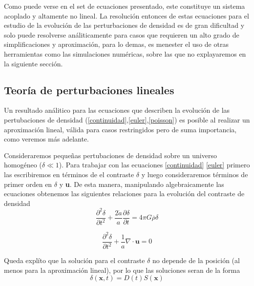Como puede verse en el set de ecuaciones presentado, este constituye un sistema acoplado y altamente no lineal. La resoluci\'on entonces de estas ecuaciones para el estudio de la evoluci\'on de las perturbaciones de densidad es de gran dificultad y solo puede resolverse an\'aliticamente para casos que requieren un alto grado de simplificaciones y aproximaci\'on, para lo demas, es menester el uso de otras herramientas como las simulaciones num\'ericas, sobre las que no explayaremos en la siguiente secci\'on. 



\subsection{Teor\'ia de perturbaciones lineales}
\label{PerturbacionesLineales}

Un resultado an\'alitico para las ecuaciones que describen la evoluci\'on de las pertubaciones de densidad (\ref{continuidad},\ref{euler},\ref{poisson}) es posible al realizar un aproximaci\'on lineal, v\'alida para casos restringidos pero de suma importancia, como veremos m\'as adelante.


Consideraremos peque\~nas pertubaciones de densidad sobre un universo homog\'eneo ($\delta \ll 1 $). Para trabajar con las ecuaciones \ref{continuidad} \ref{euler} primero las escribiremos en t\'erminos de el contraste $\delta$ y luego consideraremos t\'erminos de primer orden en $\delta$ y \textbf{u}. De esta manera, manipulando algebraicamente las ecuaciones obtenemos las siguientes relaciones para la evoluci\'on del contraste de densidad \citep{ElPeebles}
\begin{equation}
 \frac{\partial^{2}\delta}{\partial t ^{2}}+ \frac{2 \dot{a}}{a}\frac{\partial \delta}{\partial t}=4\pi G   \overline{\rho}\delta 
 \label{EcuacionDeltaAproximacion}
\end{equation}

\begin{equation}
    \frac{\partial ^{2}{\delta}}{\partial t ^{2}}+ \frac{1}{a}\nabla \cdot \textbf{u}= 0
\end{equation}{}

Queda expl\'ito que la soluci\'on para el contraste $\delta$ no depende de la posici\'on (al menos para la aproximaci\'on lineal), por lo que las soluciones seran de la forma 
\begin{equation}
    \delta({\textbf{x},t})=D(t)S(\textbf{x})
\end{equation}{}

